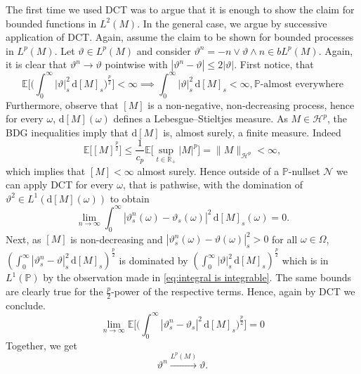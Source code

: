 \documentclass[11pt,a4paper,twoside,openany]{report}
\numberwithin{equation}{section}
\newcommand{\diff}{\mathrm{d}}
\theoremstyle{plain} %
\theoremstyle{definition} %
\theoremstyle{remark} %
\begin{document}
The first time we used DCT was to argue that it is enough to show the claim for bounded functions in \(L^2(M)\). In the general case, we argue by successive application of DCT. 
Again, assume the claim to be shown for bounded processes in \(L^p(M)\). Let \(\vartheta\in L^p(M)\) and consider \(\vartheta^n=-n\vee \vartheta\wedge n\in bL^p(M)\). Again, it is clear that \(\vartheta^n\to\vartheta\) pointwise with \(|\vartheta^n-\vartheta|\leq 2|\vartheta|\). First notice, that 
\begin{equation}\label{eq:integral is integrable}
    \mathbb{E}\Big[\Big(\int_0^{\infty}|\vartheta|_s^2\,\diff [M]_s\Big)^{\frac{p}{2}}\Big]<\infty\implies\int_0^{\infty}|\vartheta|_s^2\,\diff [M]_s<\infty,\mathbb{P}\text{-almost everywhere}
\end{equation}
 Furthermore, observe that \([M]\) is a non-negative, non-decreasing process, hence for every \(\omega\), \(\diff [M](\omega)\) defines a Lebesgue–Stieltjes measure. As \(M\in\mathcal{H}^p\), the BDG inequalities imply that \(\diff [M]\) is, almost surely, a finite measure. 
 Indeed
 \begin{equation*}
    \mathbb{E}\big[[M]^{\frac{p}{2}}\big]\leq \frac{1}{c_p}\mathbb{E}\Big[\sup_{t\in\mathbb{R}_+}|M|^p\Big]=\lVert M\rVert_{\mathcal{H}^p}<\infty,
\end{equation*}
which implies that \([M]<\infty\) almost surely. 
Hence outside of a \(\mathbb{P}\)-nullset  \(\mathcal{N}\) we can apply DCT for every \(\omega\), that is pathwise, with the domination of \(\vartheta^2\in L^1(\diff [M](\omega)) \) to obtain
\begin{equation*}
    \lim_{n\to\infty}\int_{0}^{\infty}|\vartheta_s^n(\omega)-\vartheta_s(\omega)|^2\,\diff [M]_s(\omega)=0.
\end{equation*}
Next, as \([M]\) is non-decreasing and \(|\vartheta_s^n(\omega)-\vartheta(\omega)|_s^2>0\) for all \(\omega\in\Omega\),
\((\int_0^{\infty}|\vartheta_s^n-\vartheta|_s^2\,\diff [M]_s)^{\frac{p}{2}}\) is dominated by \((\int_0^{\infty}|\vartheta|_s^2\,\diff [M]_s)^{\frac{p}{2}}\) which is in \(L^1(\mathbb{P})\) by the observation made in \eqref{eq:integral is integrable}. The same bounds are clearly true for the \(\frac{p}{2}\)-power of the respective terms. Hence, again by DCT we conclude.
\begin{equation*}
    \lim_{n\to\infty}\mathbb{E}\Big[\Big(\int_0^{\infty}|\vartheta^n_s-\vartheta_s|^2\,\diff[M]_s\Big)^{\frac{p}{2}}\Big]=0
\end{equation*}
Together, we get
\begin{equation*}
    \vartheta^n\overset{L^p(M)}{\to}\vartheta.
\end{equation*}
\end{document}
